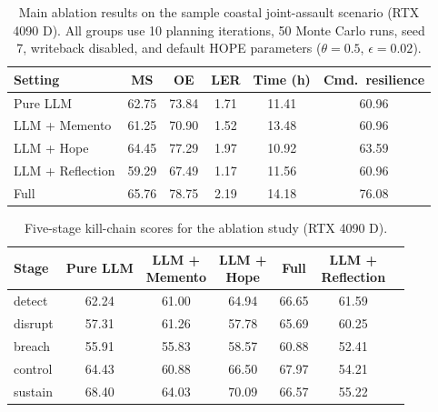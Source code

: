 \begin{table}[ht]
\centering
\caption{Main ablation results on the sample coastal joint-assault scenario
(RTX 4090 D). All groups use 10 planning iterations, 50 Monte Carlo runs,
seed 7, writeback disabled, and default HOPE parameters
($\theta=0.5$, $\epsilon=0.02$).}
\label{tab:ablation-main}
\small
\setlength{\tabcolsep}{3.2pt}
\begin{tabular}{lccccc}
\toprule
Setting & MS & OE & LER & Time (h) & Cmd.\ resilience \\
\midrule

Pure LLM & 62.75 & 73.84 & 1.71 & 11.41 & 60.96 \\
LLM + Memento & 61.25 & 70.90 & 1.52 & 13.48 & 60.96 \\
LLM + Hope & 64.45 & 77.29 & 1.97 & 10.92 & 63.59 \\
LLM + Reflection & 59.29 & 67.49 & 1.17 & 11.56 & 60.96 \\
Full & 65.76 & 78.75 & 2.19 & 14.18 & 76.08 \\
\bottomrule
\end{tabular}
\end{table}

\begin{table}[ht]
\centering
\caption{Five-stage kill-chain scores for the ablation study (RTX 4090 D).}
\label{tab:ablation-stage}
\footnotesize
\setlength{\tabcolsep}{4pt}
\begin{tabular}{lcccccc}
\toprule
Stage & Pure LLM & \shortstack{LLM +\\Memento} & \shortstack{LLM +\\Hope} & Full & \shortstack{LLM +\\Reflection} \\
\midrule

detect & 62.24 & 61.00 & 64.94 & 66.65 & 61.59 \\
disrupt & 57.31 & 61.26 & 57.78 & 65.69 & 60.25 \\
breach & 55.91 & 55.83 & 58.57 & 60.88 & 52.41 \\
control & 64.43 & 60.88 & 66.50 & 67.97 & 54.21 \\
sustain & 68.40 & 64.03 & 70.09 & 66.57 & 55.22 \\
\bottomrule
\end{tabular}
\setlength{\tabcolsep}{6pt}
\end{table}

